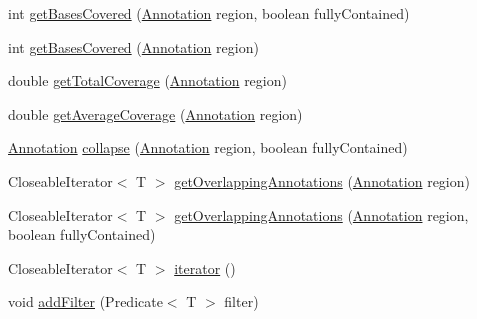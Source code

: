\begin{DoxyCompactItemize}
\item 
int \hyperlink{interfaceumms_1_1core_1_1annotation_1_1_annotation_collection_3_01_t_01extends_01_annotation_01_4_a92eaa2a64a83682f3e9afda6a5a0db41}{get\+Bases\+Covered} (\hyperlink{interfaceumms_1_1core_1_1annotation_1_1_annotation}{Annotation} region, boolean fully\+Contained)
\item 
int \hyperlink{interfaceumms_1_1core_1_1annotation_1_1_annotation_collection_3_01_t_01extends_01_annotation_01_4_a83c09fe73ace2db89e1c372d104d4faa}{get\+Bases\+Covered} (\hyperlink{interfaceumms_1_1core_1_1annotation_1_1_annotation}{Annotation} region)
\item 
double \hyperlink{interfaceumms_1_1core_1_1annotation_1_1_annotation_collection_3_01_t_01extends_01_annotation_01_4_a643ab1265b4dcd6547c36401a116dd50}{get\+Total\+Coverage} (\hyperlink{interfaceumms_1_1core_1_1annotation_1_1_annotation}{Annotation} region)
\item 
double \hyperlink{interfaceumms_1_1core_1_1annotation_1_1_annotation_collection_3_01_t_01extends_01_annotation_01_4_a23abd386efd728e409b2f8cd18d49afa}{get\+Average\+Coverage} (\hyperlink{interfaceumms_1_1core_1_1annotation_1_1_annotation}{Annotation} region)
\item 
\hyperlink{interfaceumms_1_1core_1_1annotation_1_1_annotation}{Annotation} \hyperlink{interfaceumms_1_1core_1_1annotation_1_1_annotation_collection_3_01_t_01extends_01_annotation_01_4_a57ab6ba2dd1e9ade31e4e308d21c7eb9}{collapse} (\hyperlink{interfaceumms_1_1core_1_1annotation_1_1_annotation}{Annotation} region, boolean fully\+Contained)
\item 
Closeable\+Iterator$<$ T $>$ \hyperlink{interfaceumms_1_1core_1_1annotation_1_1_annotation_collection_3_01_t_01extends_01_annotation_01_4_a9a2bd5c17d881c7e3decce83c8e2e8e6}{get\+Overlapping\+Annotations} (\hyperlink{interfaceumms_1_1core_1_1annotation_1_1_annotation}{Annotation} region)
\item 
Closeable\+Iterator$<$ T $>$ \hyperlink{interfaceumms_1_1core_1_1annotation_1_1_annotation_collection_3_01_t_01extends_01_annotation_01_4_a36d2045206d1fc86834e542d8393fdca}{get\+Overlapping\+Annotations} (\hyperlink{interfaceumms_1_1core_1_1annotation_1_1_annotation}{Annotation} region, boolean fully\+Contained)
\item 
Closeable\+Iterator$<$ T $>$ \hyperlink{interfaceumms_1_1core_1_1annotation_1_1_annotation_collection_3_01_t_01extends_01_annotation_01_4_ab7b15f648793ccec506ec3ac64168500}{iterator} ()
\item 
void \hyperlink{interfaceumms_1_1core_1_1annotation_1_1_annotation_collection_3_01_t_01extends_01_annotation_01_4_abdb77fe2ea75f570679da0b8ae379deb}{add\+Filter} (Predicate$<$ T $>$ filter)

\end{DoxyCompactItemize}
